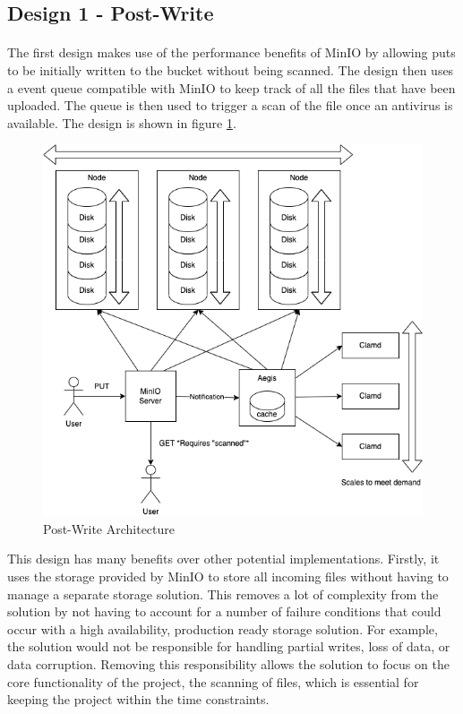 \documentclass[12pt, conference, final, a4paper, onecolumn, compsoc]{IEEEtran}
\begin{document}
\subsection*{Design 1 - Post-Write}
\paragraph{}

The first design makes use of the performance benefits of MinIO by allowing puts
to be initially written to the bucket without being scanned. The design then
uses a event queue compatible with MinIO to keep track of all the files that
have been uploaded. The queue is then used to trigger a scan of the file once an
antivirus is available. The design is shown in figure \ref{fig:postWriteArch}.

\begin{figure}
  \includegraphics[scale=.4]{diagrams/post-write.png}
  \caption{Post-Write Architecture}
  \label{fig:postWriteArch}
\end{figure}

This design has many benefits over other potential implementations. Firstly, it
uses the storage provided by MinIO to store all incoming files without having to
manage a separate storage solution. This removes a lot of complexity from the
solution by not having to account for a number of failure conditions that could
occur with a high availability, production ready storage solution. For example,
the solution would not be responsible for handling partial writes, loss of data,
or data corruption. Removing this responsibility allows the solution to focus on
the core functionality of the project, the scanning of files, which is essential
for keeping the project within the time constraints.
\end{document}
